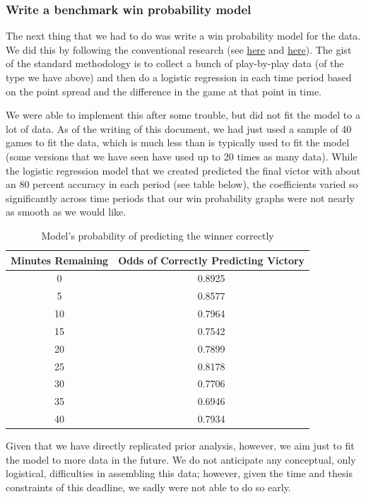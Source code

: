 \documentclass[12pt]{article}
\begin{document}
\subsubsection*{Write a benchmark win probability model}

The next thing that we had to do was write a win probability model for the data. We did this by following the conventional research (see \href{http://fivethirtyeight.com/features/how-fivethirtyeight-is-forecasting-the-2016-ncaa-tournament/}{here} and \href{http://wagesofwins.com/2009/03/05/modeling-win-probability-for-a-college-basketball-game-a-guest-post-from-brian-burke/}{here}). The gist of the standard methodology is to collect a bunch of play-by-play data (of the type we have above) and then do a logistic regression in each time period based on the point spread and the difference in the game at that point in time.

We were able to implement this after some trouble, but did not fit the model to a lot of data. As of the writing of this document, we had just used a sample of 40 games to fit the data, which is much less than is typically used to fit the model (some versions that we have seen have used up to 20 times as many data). While the logistic regression model that we created predicted the final victor with about an 80 percent accuracy in each period (see table below), the coefficients varied so significantly across time periods that our win probability graphs were not nearly as smooth as we would like. 

\begin{table}[H] 
\centering  
\caption{Model's probability of predicting the winner correctly}   
\begin{tabular}{c c}
\hline \hline
Minutes Remaining & Odds of Correctly Predicting Victory \\ [0.5ex]
\hline
0 & 0.8925 \\
5 & 0.8577 \\
10 & 0.7964 \\
15 & 0.7542 \\
20 & 0.7899 \\ 
25 & 0.8178 \\ 
30 & 0.7706 \\ 
35 & 0.6946 \\ 
40 & 0.7934 \\
\hline
\end{tabular}
\end{table}

Given that we have directly replicated prior analysis, however, we aim just to fit the model to more data in the future. We do not anticipate any conceptual, only logistical, difficulties in assembling this data; however, given the time and thesis constraints of this deadline, we sadly were not able to do so early. 
\end{document}
